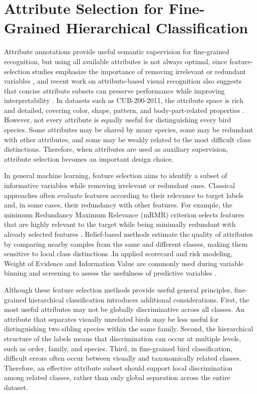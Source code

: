 \section{Attribute Selection for Fine-Grained Hierarchical Classification}

Attribute annotations provide useful semantic supervision for fine-grained recognition, but using all available attributes is not always optimal, since feature-selection studies emphasize the importance of removing irrelevant or redundant variables \cite{peng2005feature}, and recent work on attribute-based visual recognition also suggests that concise attribute subsets can preserve performance while improving interpretability \cite{yan2023learning}. In datasets such as CUB-200-2011, the attribute space is rich and detailed, covering color, shape, pattern, and body-part-related properties \cite{wah2011cub}. However, not every attribute is equally useful for distinguishing every bird species. Some attributes may be shared by many species, some may be redundant with other attributes, and some may be weakly related to the most difficult class distinctions. Therefore, when attributes are used as auxiliary supervision, attribute selection becomes an important design choice.

In general machine learning, feature selection aims to identify a subset of informative variables while removing irrelevant or redundant ones. Classical approaches often evaluate features according to their relevance to target labels and, in some cases, their redundancy with other features. For example, the minimum Redundancy Maximum Relevance (mRMR) criterion selects features that are highly relevant to the target while being minimally redundant with already selected features \cite{peng2005feature}. Relief-based methods estimate the quality of attributes by comparing nearby samples from the same and different classes, making them sensitive to local class distinctions \cite{kira1992practical, kononenko1994estimating}.In applied scorecard and risk modeling, Weight of Evidence and Information Value are commonly used during variable binning and screening to assess the usefulness of predictive variables \cite{siddiqi2012credit}.


Although these feature selection methods provide useful general principles, fine-grained hierarchical classification introduces additional considerations. First, the most useful attributes may not be globally discriminative across all classes. An attribute that separates visually unrelated birds may be less useful for distinguishing two sibling species within the same family. Second, the hierarchical structure of the labels means that discrimination can occur at multiple levels, such as order, family, and species. Third, in fine-grained bird classification, difficult errors often occur between visually and taxonomically related classes. Therefore, an effective attribute subset should support local discrimination among related classes, rather than only global separation across the entire dataset.


